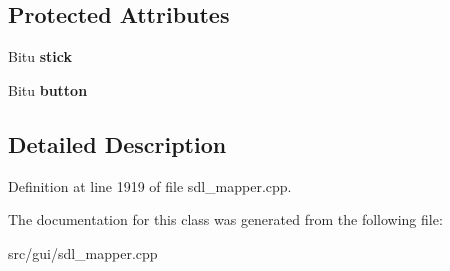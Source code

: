 \subsection*{Protected Attributes}
\begin{DoxyCompactItemize}
\item 
\hypertarget{classCJButtonEvent_aa87062af5d8bc5db801066e2eb4a74f8}{Bitu {\bfseries stick}}\label{classCJButtonEvent_aa87062af5d8bc5db801066e2eb4a74f8}

\item 
\hypertarget{classCJButtonEvent_abdbfaa23915b89b1392129c9525dd58d}{Bitu {\bfseries button}}\label{classCJButtonEvent_abdbfaa23915b89b1392129c9525dd58d}

\end{DoxyCompactItemize}


\subsection{Detailed Description}


Definition at line 1919 of file sdl\-\_\-mapper.\-cpp.



The documentation for this class was generated from the following file\-:\begin{DoxyCompactItemize}
\item 
src/gui/sdl\-\_\-mapper.\-cpp\end{DoxyCompactItemize}
